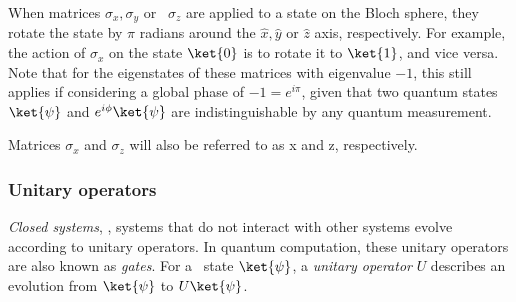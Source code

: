 When matrices $\sigma_x, \sigma_y$ or  $\sigma_z$ are applied to a state on the Bloch sphere, they rotate the state by $\pi$ radians around the $\hat{x}, \hat{y}$ or $\hat{z}$ axis, respectively. For example, the action of $\sigma_x$ on the state $\ket{0}$ is to rotate it to $\ket{1}$, and vice versa. Note that for the eigenstates of these matrices with eigenvalue $-1$, this still applies if considering a global phase of $-1 = e^{i\pi}$, given that two quantum states $\ket{\psi}$ and $e^{i\phi}\ket{\psi}$ are indistinguishable by any quantum measurement.

Matrices $\sigma_x$ and $\sigma_z$ will also be referred to as \gls{x} and \gls{z}, respectively.

\subsubsection{Unitary operators}
\begin{definition}
  \emph{Closed systems}, , systems that do not interact with other systems evolve according to unitary operators. In quantum computation, these unitary operators are also known as \emph{gates}. For a  state $\ket{\psi}$, a \emph{unitary operator} $U$ describes an evolution from $\ket{\psi}$ to $ U\ket{\psi}$.
\end{definition}

